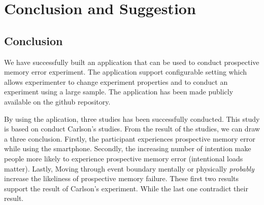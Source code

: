 \chapter{Conclusion and Suggestion}
\section{Conclusion}


We have successfully built an application that can be used to conduct prospective memory error experiment.
The application support configurable setting which allows experimenter to change experiment properties and to conduct
an experiment using a large sample. The application has been made publicly available on the github repository.

By using the aplication, three studies has been successfully conducted.
This study is based on conduct Carlson's studies. From the result of the studies,
we can draw a three conclusion. Firstly, the participant experiences prospective memory error while using the smartphone.
Secondly, the increasing number of intention make people more likely to experience prospective memory error (intentional loads matter).
Lastly, Moving through event boundary mentally or physically \textit{probably} increase the likeliness of prospective memory failure.
These first two results support the result of Carlson's experiment. While the last one
contradict their result.



